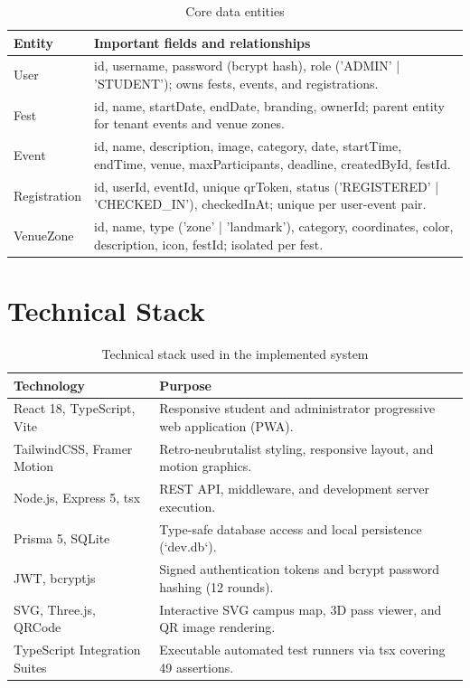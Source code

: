 \documentclass[11pt,a4paper]{report}
\begin{document}
\begin{table}[ht]
\centering
\caption{Core data entities}
\label{tab:entities}
\begin{tabular}{p{3.4cm}p{9.2cm}}
\toprule
\textbf{Entity} & \textbf{Important fields and relationships}\\
\midrule
User & id, username, password (bcrypt hash), role ('ADMIN' | 'STUDENT'); owns fests, events, and registrations.\\
Fest & id, name, startDate, endDate, branding, ownerId; parent entity for tenant events and venue zones.\\
Event & id, name, description, image, category, date, startTime, endTime, venue, maxParticipants, deadline, createdById, festId.\\
Registration & id, userId, eventId, unique qrToken, status ('REGISTERED' | 'CHECKED\_IN'), checkedInAt; unique per user-event pair.\\
VenueZone & id, name, type ('zone' | 'landmark'), category, coordinates, color, description, icon, festId; isolated per fest.\\
\bottomrule
\end{tabular}
\end{table}

\section{Technical Stack}
\begin{table}[ht]
\centering
\caption{Technical stack used in the implemented system}
\label{tab:stack}
\begin{tabular}{p{3.8cm}p{8.8cm}}
\toprule
\textbf{Technology} & \textbf{Purpose}\\
\midrule
React 18, TypeScript, Vite & Responsive student and administrator progressive web application (PWA).\\
TailwindCSS, Framer Motion & Retro-neubrutalist styling, responsive layout, and motion graphics.\\
Node.js, Express 5, tsx & REST API, middleware, and development server execution.\\
Prisma 5, SQLite & Type-safe database access and local persistence (`dev.db`).\\
JWT, bcryptjs & Signed authentication tokens and bcrypt password hashing (12 rounds).\\
SVG, Three.js, QRCode & Interactive SVG campus map, 3D pass viewer, and QR image rendering.\\
TypeScript Integration Suites & Executable automated test runners via tsx covering 49 assertions.\\
\bottomrule
\end{tabular}
\end{table}
\end{document}
